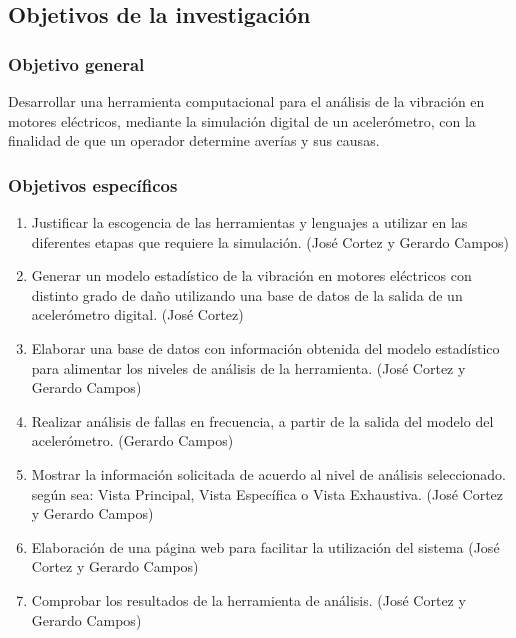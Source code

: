 \subsection{Objetivos de la investigación}

\subsubsection{Objetivo general}
	Desarrollar una herramienta computacional para el análisis de la vibración en motores eléctricos, mediante la simulación digital de un acelerómetro, con la finalidad de que un operador determine averías y sus causas.


\subsubsection{Objetivos específicos}

	\begin{enumerate}
		\item Justificar la escogencia de las herramientas y lenguajes a utilizar en las diferentes etapas que requiere la simulación. (José Cortez y Gerardo Campos)

		\item Generar un modelo estadístico de la vibración en motores eléctricos con distinto grado de daño utilizando una base de datos de la salida de un acelerómetro digital. (José Cortez)

		\item Elaborar una base de datos con información obtenida del modelo estadístico para alimentar los niveles de análisis de la herramienta. (José Cortez y Gerardo Campos) 
		
		\item Realizar análisis de fallas en frecuencia, a partir de la salida del modelo del acelerómetro. (Gerardo Campos)

		\item Mostrar la información solicitada de acuerdo al nivel de análisis seleccionado. según sea: Vista Principal, Vista Específica o Vista Exhaustiva. (José Cortez y Gerardo Campos)

		\item Elaboración de una página web para facilitar la utilización del sistema (José Cortez y Gerardo Campos)

		\item Comprobar los resultados de la herramienta de análisis. (José Cortez y Gerardo Campos)
	\end{enumerate}
